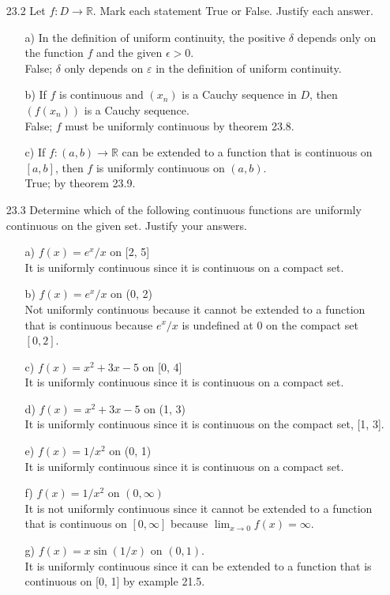 \documentclass[12pt]{article}
\begin{document}
\begin{enumerate}
\begin{enumerate}
\item[23.2] Let $f: D \rightarrow \mathbb{R}$. Mark each statement True or False. Justify each answer.
\begin{enumerate}
\item[a)] In the definition of uniform continuity, the positive $\delta$ depends only on the function $f$ and the given $\epsilon > 0$.\\
False; $\delta$ only depends on $\varepsilon$ in the definition of
uniform continuity.
\item[b)] If $f$ is continuous and $(x_n)$ is a Cauchy sequence in $D$, then $(f(x_n))$ is a Cauchy sequence. \\
False; $f$ must be uniformly continuous by theorem 23.8.
\item[c)] If $f: (a, b) \rightarrow \mathbb{R}$ can be extended to a function that is continuous on $[a, b]$, then $f$ is uniformly continuous on $(a, b)$. \\
True; by theorem 23.9.
\end{enumerate}

\item[23.3] Determine which of the following continuous functions are uniformly continuous on the given set. Justify your answers.
\begin{enumerate}
\item[a)] $f(x) = e^x/x$ on [2, 5] \\
It is uniformly continuous since it is continuous on a compact set.
\item[b)] $f(x) = e^x/x$ on (0, 2) \\
Not uniformly continuous because it cannot be extended to a function
that is continuous because $e^x/x$ is undefined at $0$ on the compact set $[0, 2]$.
\item[c)] $f(x) = x^2 + 3x - 5$ on [0, 4] \\
It is uniformly continuous since it is continuous on a compact set.
\item[d)] $f(x) = x^2 + 3x - 5$ on (1, 3) \\
It is uniformly continuous since it is continuous on the compact set, [1, 3].
\item[e)] $f(x) = 1/x^2$ on (0, 1) \\
It is uniformly continuous since it is continuous on a compact set.
\item[f)] $f(x) = 1/x^2$ on $(0, \infty)$ \\
It is not uniformly continuous since it cannot be extended to a function
that is continuous on $[0, \infty]$ because $\lim_{x \to 0} f(x) = \infty$.
\item[g)] $f(x) = x \sin (1/x)$ on $(0, 1)$. \\
It is uniformly continuous since it can be extended to a function that
is continuous on [0, 1] by example 21.5.
\end{enumerate}


\end{enumerate}
\end{enumerate}
\end{document}
